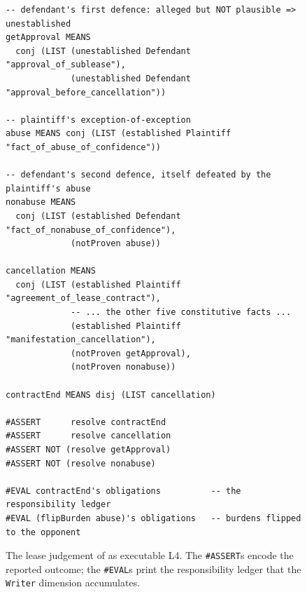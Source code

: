 \documentclass[sigconf,nonacm]{acmart}
\newcommand{\code}[1]{\texttt{\small #1}}
\begin{document}
\begin{figure}[t]
\begin{lstlisting}
-- defendant's first defence: alleged but NOT plausible => unestablished
getApproval MEANS
  conj (LIST (unestablished Defendant "approval_of_sublease"),
             (unestablished Defendant "approval_before_cancellation"))

-- plaintiff's exception-of-exception
abuse MEANS conj (LIST (established Plaintiff "fact_of_abuse_of_confidence"))

-- defendant's second defence, itself defeated by the plaintiff's abuse
nonabuse MEANS
  conj (LIST (established Defendant "fact_of_nonabuse_of_confidence"),
             (notProven abuse))

cancellation MEANS
  conj (LIST (established Plaintiff "agreement_of_lease_contract"),
             -- ... the other five constitutive facts ...
             (established Plaintiff "manifestation_cancellation"),
             (notProven getApproval),
             (notProven nonabuse))

contractEnd MEANS disj (LIST cancellation)

#ASSERT      resolve contractEnd
#ASSERT      resolve cancellation
#ASSERT NOT (resolve getApproval)
#ASSERT NOT (resolve nonabuse)

#EVAL contractEnd's obligations          -- the responsibility ledger
#EVAL (flipBurden abuse)'s obligations   -- burdens flipped to the opponent
\end{lstlisting}
\caption{The lease judgement of \cite{satoh2011proleg} as executable L4. The
\code{\#ASSERT}s encode the reported outcome; the \code{\#EVAL}s print the
responsibility ledger that the \code{Writer} dimension accumulates.}
\label{fig:burdenlease}
\end{figure}
\end{document}
